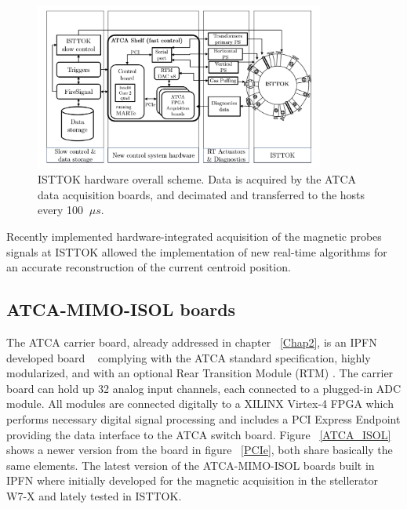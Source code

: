 \begin{figure}[htbp]
	\centering
	\includegraphics[width=0.85\textwidth]{Chp4/control_schem_1.PNG}
	\caption{\label{ISTTOK_hard} ISTTOK hardware overall scheme. Data is acquired by the
		ATCA data acquisition boards, and decimated and transferred to the hosts
		every 100 $~\mu s$. }
\end{figure}


Recently implemented hardware-integrated acquisition of the magnetic probes signals at ISTTOK allowed the implementation of new real-time algorithms for an accurate reconstruction of the current centroid position. \smallskip

\subsection{ATCA-MIMO-ISOL boards}

The ATCA carrier board, already  addressed in chapter ~\ref{Chap2}, is an IPFN developed board ~\cite{Batista2010} complying with the ATCA standard specification, highly modularized, and with an optional Rear Transition Module (RTM) . The carrier board can hold up 32 analog input channels, each connected to a plugged-in ADC module. All modules are connected digitally to a XILINX Virtex-4 FPGA which performs necessary digital signal processing and includes a PCI Express Endpoint providing the data interface to the ATCA switch board. Figure ~\ref{ATCA_ISOL} shows a newer version   from the board in figure ~\ref{PCIe}, both share basically the same elements. The latest version of the ATCA-MIMO-ISOL boards built in IPFN where initially developed for the magnetic acquisition in the stellerator W7-X and lately tested in ISTTOK.  
\smallskip




